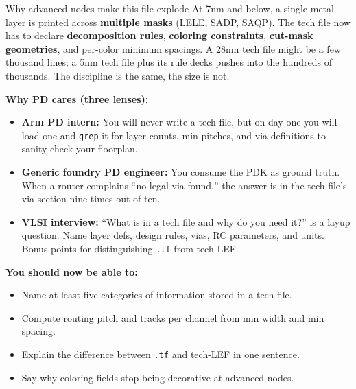 \begin{sidebar}{Why advanced nodes make this file explode}
At 7nm and below, a single metal layer is printed across \textbf{multiple masks} (LELE, SADP, SAQP). The tech file now has to declare \textbf{decomposition rules}, \textbf{coloring constraints}, \textbf{cut-mask geometries}, and per-color minimum spacings. A 28nm tech file might be a few thousand lines; a 5nm tech file plus its rule decks pushes into the hundreds of thousands. The discipline is the same, the size is not.
\end{sidebar}

\begin{pdnote}
\textbf{Why PD cares (three lenses):}
\begin{itemize}
  \item \textbf{Arm PD intern:} You will never write a tech file, but on day one you will load one and \texttt{grep} it for layer counts, min pitches, and via definitions to sanity check your floorplan.
  \item \textbf{Generic foundry PD engineer:} You consume the PDK as ground truth. When a router complains \enquote{no legal via found,} the answer is in the tech file's via section nine times out of ten.
  \item \textbf{VLSI interview:} \enquote{What is in a tech file and why do you need it?} is a layup question. Name layer defs, design rules, vias, RC parameters, and units. Bonus points for distinguishing \texttt{.tf} from tech-LEF.
\end{itemize}
\end{pdnote}

\begin{checkpoint}
\textbf{You should now be able to:}
\begin{itemize}
  \item Name at least five categories of information stored in a tech file.
  \item Compute routing pitch and tracks per channel from min width and min spacing.
  \item Explain the difference between \texttt{.tf} and tech-LEF in one sentence.
  \item Say why coloring fields stop being decorative at advanced nodes.
\end{itemize}

\end{checkpoint}

